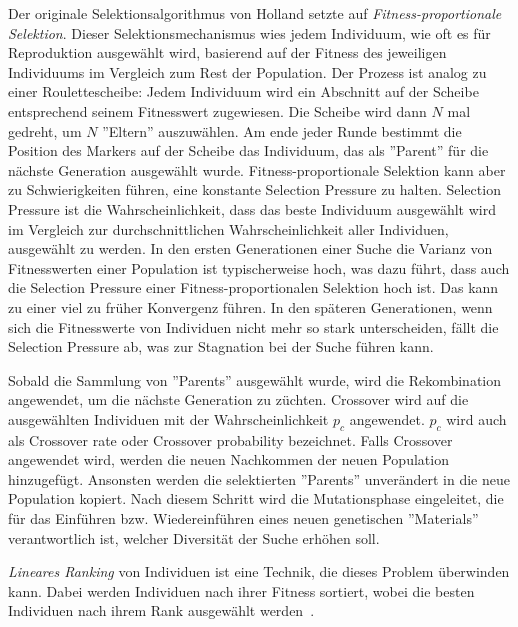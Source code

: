 \documentclass{article}
\begin{document}
Der originale Selektionsalgorithmus von Holland  setzte auf \textit{Fitness-proportionale Selektion}. Dieser Selektionsmechanismus wies jedem Individuum, wie oft es für Reproduktion ausgewählt wird, basierend auf der Fitness des jeweiligen Individuums im Vergleich zum Rest der Population. Der Prozess ist analog zu einer Roulettescheibe: Jedem Individuum wird ein Abschnitt auf der Scheibe entsprechend seinem Fitnesswert zugewiesen. Die Scheibe wird dann $N$ mal gedreht, um $N$ ''Eltern'' auszuwählen. Am ende jeder Runde bestimmt die Position des Markers auf der Scheibe das Individuum, das als ''Parent'' für die nächste Generation ausgewählt wurde. Fitness-proportionale Selektion kann aber zu Schwierigkeiten führen, eine konstante Selection Pressure zu halten. Selection Pressure ist die Wahrscheinlichkeit, dass das beste Individuum ausgewählt wird im Vergleich zur durchschnittlichen Wahrscheinlichkeit aller Individuen, ausgewählt zu werden. In den ersten Generationen einer Suche die Varianz von Fitnesswerten einer Population ist typischerweise hoch, was dazu führt, dass auch die Selection Pressure einer Fitness-proportionalen Selektion hoch ist. Das kann zu einer viel zu früher Konvergenz führen. In den späteren Generationen, wenn sich die Fitnesswerte von Individuen nicht mehr so stark unterscheiden, fällt die Selection Pressure ab, was zur Stagnation bei der Suche führen kann.

Sobald die Sammlung von ''Parents'' ausgewählt wurde, wird die Rekombination angewendet, um die nächste Generation zu züchten. Crossover wird auf die ausgewählten Individuen mit der Wahrscheinlichkeit $p_c$ angewendet. $p_c$ wird auch als Crossover rate oder Crossover probability bezeichnet. Falls Crossover angewendet wird, werden die neuen Nachkommen der neuen Population hinzugefügt. Ansonsten werden die selektierten ''Parents'' unverändert in die neue Population kopiert. Nach diesem Schritt wird die Mutationsphase eingeleitet, die für das Einführen bzw. Wiedereinführen eines neuen genetischen ''Materials'' verantwortlich ist, welcher Diversität der Suche erhöhen soll.

\textit{Lineares Ranking} von Individuen ist eine Technik, die dieses Problem überwinden kann. Dabei werden Individuen nach ihrer Fitness sortiert, wobei die besten Individuen nach ihrem Rank ausgewählt werden~\cite{whitley1989genitor}. 
\end{document}
